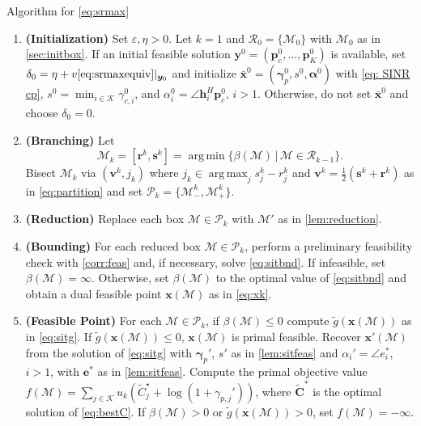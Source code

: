 \documentclass[a4paper,10pt,journal]{IEEEtran}
\DeclareMathOperator*\argmax{arg\,max}
\DeclareMathOperator*\argmin{arg\,min}
\let\vec\bm
\begin{document}
\begin{algorithm}
\renewcommand{\crefrangeconjunction}{--}
	\caption{ Algorithm for \cref{eq:srmax}}\label{alg:sitbb}
	\small
	\centering
	\begin{minipage}{\linewidth-1em}
	\begin{enumerate}[label=\textbf{Step \arabic*},ref=Step~\arabic*,start=0,leftmargin=*]
		\item\label{alg:sitbb:init} {\bfseries (Initialization)} Set $\varepsilon, \eta > 0$. 
			Let $k=1$ and $\mathscr R_0 = \{ \mathcal M_0 \}$ with $\mathcal M_0$ as in \cref{sec:initbox}.
			If an initial feasible solution $\vec y^0 = (\vec p_c^0, \dots, \vec p_K^0)$ is available, set $\delta_0 = \eta + v\eqref{eq:srmaxequiv}|_{\vec y_0}$ and initialize $\bar{\vec x}^0 = (\vec\gamma_p^0, s^0, \vec\alpha^0)$ with \cref{eq: SINR cp}, $s^0 = \min_{i\in\mathcal K} \gamma_{c,i}^0$, and $\alpha^0_i = \angle \vec h_{i}^H \vec p_c^0$, $i>1$.
			Otherwise, do not set $\bar{\vec x}^0$ and choose $\delta_0 = 0$.
%
		\item\label{alg:sitbb:branch} {\bfseries (Branching)} Let $$\mathcal M_k = [\vec r^k, \vec s^k] = \argmin\{\beta(\mathcal M) \,|\, \mathcal M\in\mathscr R_{k-1} \}.$$ Bisect $\mathcal M_k$ via $(\vec v^k, j_k)$ where $j_k \in \argmax_j s^k_j - r^k_j$ and $\vec v^k = \frac{1}{2} (\vec s^k + \vec r^k)$ as in \cref{eq:partition} and set $\mathscr P_{k} = \{\mathcal M^k_-, \mathcal M^k_+\}$.
%
		\item\label{alg:sitbb:reduction} {\bfseries (Reduction)} Replace each box $\mathcal M\in\mathscr P_k$ with $\mathcal M'$ as in \cref{lem:reduction}.
%
		\item\label{alg:sitbb:bounding} {\bfseries (Bounding)} For each reduced box $\mathcal M\in\mathscr P_k$, perform a preliminary feasibility check with \cref{corr:feas} and, if necessary, solve \cref{eq:sitbnd}. If infeasible, set $\beta(\mathcal M) = \infty$. Otherwise, set $\beta(\mathcal M)$ to the optimal value of \cref{eq:sitbnd} and obtain a dual feasible point $\vec x(\mathcal M)$ as in \cref{eq:xk}.
%
		\item\label{alg:sitbb:feaspoint} {\bfseries (Feasible Point)} For each $\mathcal M\in\mathscr P_k$, if $\beta(\mathcal M) \le 0$ compute $\tilde g(\vec x(\mathcal M))$ as in \cref{eq:sitg}. If $\tilde g(\vec x(\mathcal M)) \le 0$, $\vec x(\mathcal M)$ is primal feasible. Recover $\vec x'(\mathcal M)$ from the solution of \cref{eq:sitg} with $\vec\gamma_p'$, $s'$ as in \cref{lem:sitfeas} and $\alpha_i' = \angle e_i^*$, $i > 1$, with $\vec e^*$ as in \cref{lem:sitfeas}. Compute the primal objective value $f(\mathcal M) = \sum_{j\in\mathcal K} u_k (\tilde{C}_j^\star + \log(1+\gamma_{p,j}'))$, where $\tilde{\vec C}^*$  is the optimal solution of \cref{eq:bestC}. If $\beta(\mathcal M) > 0$ or $\tilde g(\vec x(\mathcal M)) > 0$, set $f(\mathcal M) = -\infty$.

\end{enumerate}
\end{minipage}
\end{algorithm}
\end{document}
